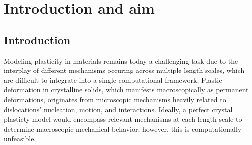 \documentclass[11pt]{article}
\begin{document}
\section{Introduction and aim}
\subsection{Introduction}
Modeling plasticity in materials remains today a challenging task due to the interplay of different mechanisms occuring across multiple length scales, which are difficult to integrate into a single computational framework. Plastic deformation in crystalline solids, which manifests macroscopically as permanent deformations, originates from microscopic mechanisms heavily related to dislocations' nucleation, motion, and interactions. Ideally, a perfect crystal plasticty model would encompass relevant mechanisms at each length scale to determine macroscopic mechanical behavior; however, this is computationally unfeasible.\\
\end{document}
